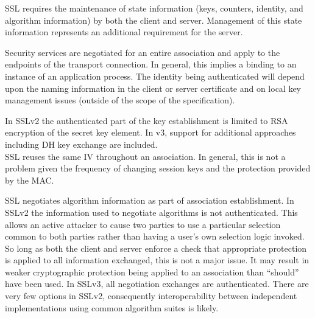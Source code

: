  SSL requires the maintenance of state information (keys, counters,
  identity, and algorithm information) by both the client and server.
  Management of this state information represents an additional requirement
  for the server.

  
  Security services are negotiated for an entire association and apply to
  the endpoints of the transport connection. In general, this implies a
  binding to an instance of an application process. The identity being
  authenticated will depend upon the naming information in the client or
  server certificate and on local key management issues (outside of the
  scope of the specification).

  
  In SSLv2 the authenticated part of the key establishment is limited to
  RSA encryption of the secret key element. In v3, support for additional
  approaches including DH key exchange are included.\\
  
  SSL reuses the same IV throughout an association. In general, this is not
  a problem given the frequency of changing session keys and the protection
  provided by the MAC.

  
  SSL negotiates algorithm information as part of association
  establishment. In SSLv2 the information used to negotiate algorithms is
  not authenticated. This allows an active attacker to cause two parties to
  use a particular selection common to both parties rather than having a
  user's own selection logic invoked. So long as both the client and server
  enforce a check that appropriate protection is applied to all information
  exchanged, this is not a major issue. It may result in weaker
  cryptographic protection being applied to an association than ``should''
  have been used. In SSLv3, all negotiation exchanges are authenticated.
  There are very few options in SSLv2, consequently interoperability
  between independent implementations using common algorithm suites is
  likely.

